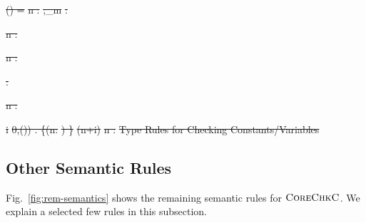 \documentclass[conference]{IEEEtran}
\newcommand{\lang}{\textsc{CoreChkC}\xspace}
\newcommand{\tptr}[2]{\ensuremath{\mathtt{ptr}^{#2}~{#1}}}
\newcommand{\evalue}[2]{\ensuremath{{#1}\!:\!{#2}}}
\newcommand{\tint}{\ensuremath{\mathtt{int}}}
\newcommand{\heap}{\ensuremath{\mathpzc{H}}}
\newcommand{\fv}{\mathit{FV}}
\newcommand{\size}{\mathit{size}}
\newcommand{\cmode}{\texttt{c}}
\newcommand{\umode}{\texttt{u}}
\providecommand{\DIFdel}[1]{{\protect\color{red}\sout{#1}}}                      %
\providecommand{\DIFdelend}{} %
\providecommand{\DIFdelFL}[1]{\DIFdel{#1}} %
\DeclareRobustCommand{\DIFdelend}{\DIFOaddend \let\includegraphics\DIFOincludegraphics} %
\begin{document}
\DIFdelFL{\fv(\tau) = \emptyset }%
\DIFdelFL{\emptyset \vdash n : \tau}%
\DIFdelFL{\Gamma;\Theta\vdash_m }%
\DIFdelFL{: \tau}%

\DIFdelFL{
 }%
\DIFdelFL{\sigma \vdash n : }%

\DIFdelFL{\sigma \vdash n : }%

\DIFdelFL{\sigma {} : }%

\DIFdelFL{\in \sigma}%
\DIFdelFL{\sigma \vdash n : }%

\DIFdelFL{\forall i \in }%
\DIFdelFL{0,\size(\omega)) .
            \sigma \cup \{(n:}%
\DIFdelFL{) \}\vdash }%
\DIFdelFL{(n+i)}%
\DIFdelFL{\sigma \vdash n : }%
{%
\DIFdelFL{Type Rules for Checking Constants/Variables}}

\DIFdelend \subsection{Other Semantic Rules}\label{sec:rem-semantics}

Fig.~\ref{fig:rem-semantics} shows the remaining semantic rules for
$\lang$. We explain a selected few rules in this subsection.
\end{document}
